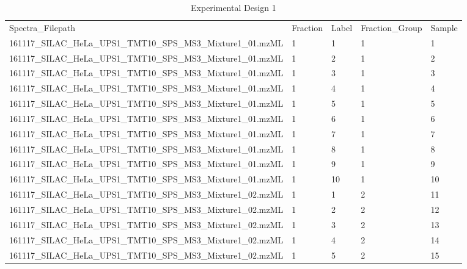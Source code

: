 \begin{table}[ht]
\caption{Experimental Design 1}
\label{t:isobaric_experimental_design_table_0}
\centering
\tiny
\begin{tabular*}{0.90\textwidth}{lllll}
Spectra\_Filepath & Fraction & Label & Fraction\_Group & Sample \\
161117\_SILAC\_HeLa\_UPS1\_TMT10\_SPS\_MS3\_Mixture1\_01.mzML & 1        & 1     & 1               & 1      \\
161117\_SILAC\_HeLa\_UPS1\_TMT10\_SPS\_MS3\_Mixture1\_01.mzML & 1        & 2     & 1               & 2      \\
161117\_SILAC\_HeLa\_UPS1\_TMT10\_SPS\_MS3\_Mixture1\_01.mzML & 1        & 3     & 1               & 3      \\
161117\_SILAC\_HeLa\_UPS1\_TMT10\_SPS\_MS3\_Mixture1\_01.mzML & 1        & 4     & 1               & 4      \\
161117\_SILAC\_HeLa\_UPS1\_TMT10\_SPS\_MS3\_Mixture1\_01.mzML & 1        & 5     & 1               & 5      \\
161117\_SILAC\_HeLa\_UPS1\_TMT10\_SPS\_MS3\_Mixture1\_01.mzML & 1        & 6     & 1               & 6      \\
161117\_SILAC\_HeLa\_UPS1\_TMT10\_SPS\_MS3\_Mixture1\_01.mzML & 1        & 7     & 1               & 7      \\
161117\_SILAC\_HeLa\_UPS1\_TMT10\_SPS\_MS3\_Mixture1\_01.mzML & 1        & 8     & 1               & 8      \\
161117\_SILAC\_HeLa\_UPS1\_TMT10\_SPS\_MS3\_Mixture1\_01.mzML & 1        & 9     & 1               & 9      \\
161117\_SILAC\_HeLa\_UPS1\_TMT10\_SPS\_MS3\_Mixture1\_01.mzML & 1        & 10   & 1               & 10     \\
161117\_SILAC\_HeLa\_UPS1\_TMT10\_SPS\_MS3\_Mixture1\_02.mzML & 1        & 1     & 2               & 11     \\
161117\_SILAC\_HeLa\_UPS1\_TMT10\_SPS\_MS3\_Mixture1\_02.mzML & 1        & 2     & 2               & 12     \\
161117\_SILAC\_HeLa\_UPS1\_TMT10\_SPS\_MS3\_Mixture1\_02.mzML & 1        & 3     & 2               & 13     \\
161117\_SILAC\_HeLa\_UPS1\_TMT10\_SPS\_MS3\_Mixture1\_02.mzML & 1        & 4     & 2               & 14     \\
161117\_SILAC\_HeLa\_UPS1\_TMT10\_SPS\_MS3\_Mixture1\_02.mzML & 1        & 5     & 2               & 15     \\

\end{tabular*}
\end{table}

